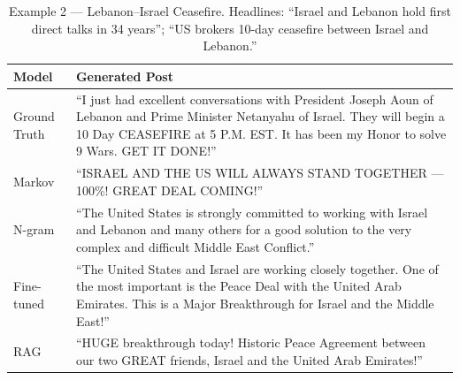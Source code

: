 \documentclass[11pt,a4paper]{article}
\begin{document}
\begin{table}[H]
\centering
\caption{Example 2 --- Lebanon--Israel Ceasefire. Headlines: ``Israel and Lebanon hold first direct talks in 34 years''; ``US brokers 10-day ceasefire between Israel and Lebanon.''}
\label{tab:qual2}
\begin{tabular}{lp{9.5cm}}
\toprule
\textbf{Model} & \textbf{Generated Post} \\
\midrule
Ground Truth  & ``I just had excellent conversations with President Joseph Aoun of Lebanon and Prime Minister Netanyahu of Israel. They will begin a 10 Day CEASEFIRE at 5 P.M. EST. It has been my Honor to solve 9 Wars. GET IT DONE!'' \\
\midrule
Markov        & ``ISRAEL AND THE US WILL ALWAYS STAND TOGETHER — 100\%! GREAT DEAL COMING!'' \\
N-gram        & ``The United States is strongly committed to working with Israel and Lebanon and many others for a good solution to the very complex and difficult Middle East Conflict.'' \\
Fine-tuned    & ``The United States and Israel are working closely together. One of the most important is the Peace Deal with the United Arab Emirates. This is a Major Breakthrough for Israel and the Middle East!'' \\
RAG           & ``HUGE breakthrough today! Historic Peace Agreement between our two GREAT friends, Israel and the United Arab Emirates!'' \\
\bottomrule
\end{tabular}
\end{table}
\end{document}
